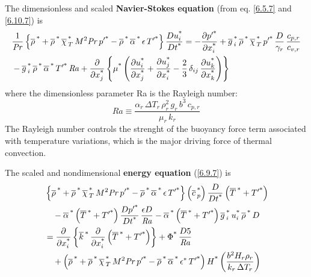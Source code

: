 \documentclass[document.tex]{subfiles}
\begin{document}
The dimensionless and scaled \textbf{Navier-Stokes equation} (from eq. \ref{6.5.7} and \ref{6.10.7}) is 
\begin{align}
  & \frac{1}{\mathit{Pr}}
    \left\{ \overline{\rho}\,^{\textup{*}}
    + \overline{\rho}\,^{\textup{*}}\,\overline{\chi}\,_{T}^{\textup{*}}\, M^2 \mathit{Pr}\, p'^{\textup{*}}
    - \overline{\rho}\,^{\textup{*}}\,\overline{\alpha}\,^{\textup{*}}\,\epsilon\, T'^{\textup{*}}
    \right\}
    \frac{D u_i^{\textup{*}}}{D t^{\textup{*}}}
    = - \pdv{\ensuremath p'^{\textup{*}}}{\ensuremath x_i^{\textup{*}}}
    + \overline{g}\,_i^{\textup{*}}\,\overline{\rho}\,^{\textup{*}}\,\overline{\chi}\,_{T}^{\textup{*}}\, p'^{\textup{*}}\,
      \frac{D}{\gamma_r}\,\frac{c_{p,r}}{c_{v,r}} \nonumber \\
  & - \overline{g}\,_i^{\textup{*}}\,\overline{\rho}\,^{\textup{*}}\,\overline{\alpha}\,^{\textup{*}}\, T'^{\textup{*}}\, \mathit{Ra}
    + \pdv{\ensuremath x_j^{\textup{*}}}
    \left\{ \mu^{\textup{*}}
    \left( \pdv{\ensuremath u_i^{\textup{*}}}{\ensuremath x_j^{\textup{*}}} + \pdv{\ensuremath u_j^{\textup{*}}}{\ensuremath x_i^{\textup{*}}}
    - \frac{2}{3}\,\delta_{ij}\,\pdv{\ensuremath u_k^{\textup{*}}}{\ensuremath x_k^{\textup{*}}} \right)
    \right\}
  \label{eq:6.10.19}
\end{align}
where the dimensionless parameter Ra is the Rayleigh number:
\begin{equation}
  \mathit{Ra} \equiv
  \frac{\alpha_r \, \Delta T_r \, \rho_r^2 \, g_r \, b^3 \, c_{p,r}}
       {\mu_r \, k_r}
  \label{eq:6.10.20}
\end{equation}
The Rayleigh number controls the strenght of the buoyancy force term associated with temperature variations, 
which is the major driving force of thermal convection. 

The scaled and nondimensional \textbf{energy equation} (\ref{6.9.7}) is 
\begin{align}
  & \left\{ \overline{\rho}\,^{\textup{*}}
    + \overline{\rho}\,^{\textup{*}}\,\overline{\chi}\,_{T}^{\textup{*}}\, M^2 \mathit{Pr}\, p'^{\textup{*}}
    - \overline{\rho}\,^{\textup{*}}\,\overline{\alpha}\,^{\textup{*}}\,\epsilon\, T'^{\textup{*}} \right\}
    \left( \overline{c}\,_p^{\textup{*}} \right)
    \frac{D }{D t^{\textup{*}}}
    \left( \overline{T}\,^{\textup{*}} + T'^{\textup{*}} \right)
    \nonumber \\
  & \quad - \overline{\alpha}\,^{\textup{*}}
    \left( \overline{T}\,^{\textup{*}} + T'^{\textup{*}} \right)
    \frac{D p'^{\textup{*}}}{D t^{\textup{*}}}\,\frac{\epsilon D}{\mathit{Ra}}
    - \overline{\alpha}\,^{\textup{*}}
    \left( \overline{T}\,^{\textup{*}} + T'^{\textup{*}} \right)
    \overline{g}\,_i^{\textup{*}}\,u_i^{\textup{*}}\,\overline{\rho}\,^{\textup{*}}\,D
    \nonumber \\
  & = \pdv{\ensuremath x_i^{\textup{*}}}
    \left\{ \overline{k}\,^{\textup{*}}\,\pdv{\ensuremath x_i^{\textup{*}}}
    \left( \overline{T}\,^{\textup{*}} + T'^{\textup{*}} \right) \right\}
    + \Phi^{\textup{*}}\,\frac{D5}{\mathit{Ra}}
    \nonumber \\
  & \quad + \left( \overline{\rho}\,^{\textup{*}}
    + \overline{\rho}\,^{\textup{*}}\,\overline{\chi}\,_{T}^{\textup{*}}\, M^2 \mathit{Pr}\, p'^{\textup{*}}
    - \overline{\rho}\,^{\textup{*}}\,\overline{\alpha}\,^{\textup{*}}\,\epsilon^{*}\, T'^{\textup{*}} \right)
    H^{\textup{*}}
    \left( \frac{b^2 H_r \rho_r}{k_r \, \Delta T_r} \right)
  \label{eq:6.10.25}
\end{align}
\end{document}
